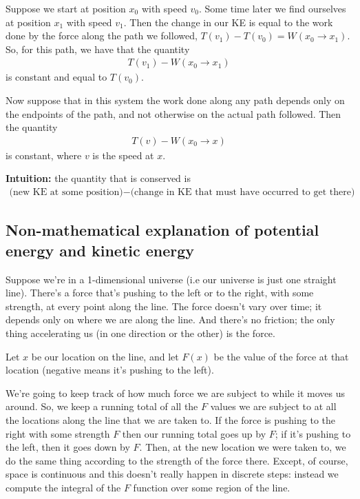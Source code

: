 Suppose we start at position $x_0$ with speed $v_0$. Some time later we find ourselves at position
$x_1$ with speed $v_1$. Then the change in our KE is equal to the work done by the force along the
path we followed, $T(v_1) - T(v_0) = W(x_0 \to x_1)$. So, for this path, we have that the quantity
\begin{align*}
  T(v_1) - W(x_0 \to x_1)
\end{align*}
is constant and equal to $T(v_0)$.


Now suppose that in this system the work done along any path depends only on the endpoints of the
path, and not otherwise on the actual path followed. Then the quantity
\begin{align*}
  T(v) - W(x_0 \to x)
\end{align*}
is constant, where $v$ is the speed at $x$.

{\bf Intuition:} the quantity that is conserved is
\begin{align*}
  \text{(new KE at some position)} - \text{(change in KE that must have occurred to get there)}
\end{align*}



\subsection{Non-mathematical explanation of potential energy and kinetic energy}

Suppose we're in a 1-dimensional universe (i.e our universe is just one straight line). There's a
force that's pushing to the left or to the right, with some strength, at every point along the
line. The force doesn't vary over time; it depends only on where we are along the line. And there's
no friction; the only thing accelerating us (in one direction or the other) is the force.


Let $x$ be our location on the line, and let $F(x)$ be the value of the force at that location
(negative means it's pushing to the left).

We're going to keep track of how much force we are subject to while it moves us around. So, we keep
a running total of all the $F$ values we are subject to at all the locations along the line that we
are taken to. If the force is pushing to the right with some strength $F$ then our running total
goes up by $F$; if it's pushing to the left, then it goes down by $F$. Then, at the new location we
were taken to, we do the same thing according to the strength of the force there. Except, of course,
space is continuous and this doesn't really happen in discrete steps: instead we compute the
integral of the $F$ function over some region of the line.

